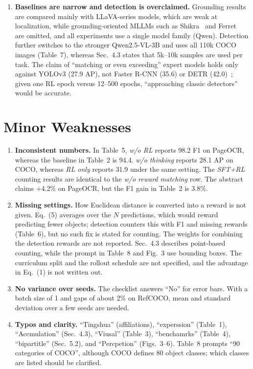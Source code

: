 \documentclass[10pt,twocolumn,letterpaper]{article}
\begin{document}
\begin{enumerate}
    \item \textbf{Baselines are narrow and detection is overclaimed.} Grounding results are compared mainly with LLaVA-series models, which are weak at localization, while grounding-oriented MLLMs such as Shikra~\cite{chen2023shikra} and Ferret~\cite{you2024ferret} are omitted, and all experiments use a single model family (Qwen). Detection further switches to the stronger Qwen2.5-VL-3B and uses all 110k COCO images (Table~7), whereas Sec.~4.3 states that 5k--10k samples are used per task. The claim of ``matching or even exceeding'' expert models holds only against YOLOv3 (27.9 AP), not Faster R-CNN (35.6) or DETR (42.0)~\cite{carion2020detr}; given one RL epoch versus 12--500 epochs, ``approaching classic detectors'' would be accurate.
\end{enumerate}

\section{Minor Weaknesses}
\begin{enumerate}
    \item \textbf{Inconsistent numbers.} In Table~5, \textit{w/o RL} reports 98.2 F1 on PageOCR, whereas the baseline in Table~2 is 94.4. \textit{w/o thinking} reports 28.1 AP on COCO, whereas \textit{RL only} reports 31.9 under the same setting. The \textit{SFT+RL} counting results are identical to the \textit{w/o reward matching} row. The abstract claims +4.2\% on PageOCR, but the F1 gain in Table~2 is 3.8\%.

    \item \textbf{Missing settings.} How Euclidean distance is converted into a reward is not given. Eq.~(5) averages over the $N$ predictions, which would reward predicting fewer objects; detection counters this with F1 and missing rewards (Table~6), but no such fix is stated for counting. The weights for combining the detection rewards are not reported. Sec.~4.3 describes point-based counting, while the prompt in Table~8 and Fig.~3 use bounding boxes. The curriculum split and the rollout schedule are not specified, and the advantage in Eq.~(1) is not written out.

    \item \textbf{No variance over seeds.} The checklist answers ``No'' for error bars. With a batch size of 1 and gaps of about 2\% on RefCOCO, mean and standard deviation over a few seeds are needed.

    \item \textbf{Typos and clarity.} ``Tingshua'' (affiliations), ``experssion'' (Table~1), ``Accmulation'' (Sec.~4.3), ``Viusal'' (Table~3), ``benchamrks'' (Table~4), ``bipartitle'' (Sec.~5.2), and ``Percpetion'' (Figs.~3--6). Table~8 prompts ``90 categories of COCO'', although COCO defines 80 object classes; which classes are listed should be clarified.
\end{enumerate}
\end{document}
